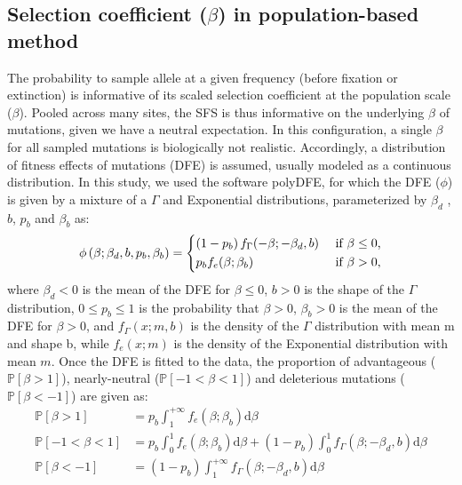 \documentclass{article}
\newcommand{\der}{\mathrm{d}}
\newcommand{\proba}{\mathbb{P}}
\newcommand{\Spop}{\beta}
\newcommand{\polyDel}{\Spop < -1}
\newcommand{\polyNeutral}{-1 < \Spop < 1}
\newcommand{\polyAdv}{ \Spop > 1}
\newcommand{\PpolyDel}{\proba \left[ \polyDel \right]}
\newcommand{\PpolyNeutral}{\proba \left[ \polyNeutral \right]}
\newcommand{\PpolyAdv}{\proba \left[ \polyAdv \right]}
\begin{document}
    \subsection{Selection coefficient ($\Spop$) in population-based method}
    \label{subsec:s-polymorphism-method}
    The probability to sample allele at a given frequency (before fixation or extinction) is informative of its scaled selection coefficient at the population scale ($\Spop$).
    Pooled across many sites, the SFS is thus informative on the underlying $\Spop$ of mutations, given we have a neutral expectation.
    In this configuration, a single $\Spop$ for all sampled mutations is biologically not realistic.
    Accordingly, a distribution of fitness effects of mutations (DFE) is assumed, usually modeled as a continuous distribution\cite{eyre-walker_distribution_2006, eyre-walker_estimating_2009}.
    In this study, we used the software polyDFE\cite{tataru_inference_2017, tataru_polydfe_2020}, for which the DFE ($\phi$) is given by a mixture of a $\Gamma$ and Exponential distributions, parameterized by $\Spop_d$ , $b$, $p_b$
    and $\Spop_b$ as:
    \begin{equation*}
        \phi \left( \Spop; \Spop_d , b, p_b, \Spop_b \right) =
        \begin{dcases}
            \left( 1 - p_b \right) f_{\Gamma}(-\Spop; -\Spop_d, b) & \text{ if $\Spop \leq 0$,} \\
            p_b f_{e}(\Spop; \Spop_b) & \text{ if $\Spop > 0$,} \\
        \end{dcases}
    \end{equation*}
    where $\Spop_d < 0 $ is the mean of the DFE for $\Spop \leq 0$,
    $b > 0$ is the shape of the $\Gamma$ distribution,
    $0 \leq p_b \leq 1$ is the probability that $\Spop > 0$,
    $\Spop_b > 0$ is the mean of the DFE for $\Spop > 0$,
    and $f_{\Gamma}(x; m, b)$ is the density of the $\Gamma$ distribution with mean m and shape b, while $f_{e}(x; m)$ is the density of the Exponential distribution with mean $m$.
    Once the DFE is fitted to the data, the proportion of advantageous ($\PpolyAdv$), nearly-neutral ($\PpolyNeutral$) and deleterious mutations ($\PpolyDel$) are given as:
    \begin{align*}
        \PpolyAdv &= p_b \int_{1}^{+\infty} f_{e}(\Spop; \Spop_b) \der \Spop  \\
        \PpolyNeutral &= p_b \int_{0}^{1} f_{e}(\Spop; \Spop_b) \der \Spop + \left( 1 - p_b \right) \int_{0}^{1} f_{\Gamma}(\Spop; -\Spop_d, b) \der \Spop \\
        \PpolyDel &= \left( 1 - p_b \right) \int_{1}^{+\infty} f_{\Gamma}(\Spop; -\Spop_d, b) \der \Spop
    \end{align*}
\end{document}
